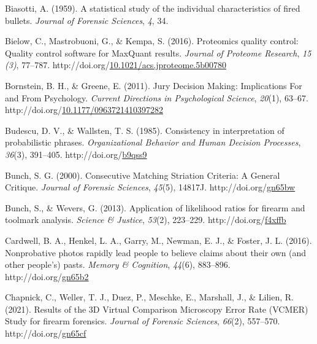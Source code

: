 \documentclass[print]{nuthesis}
\newlength{\cslhangindent}
\newenvironment{CSLReferences}[2]%
{\setlength{\parindent}{0pt}%
\everypar{\setlength{\hangindent}{\cslhangindent}}\ignorespaces}%
{\par}
\begin{document}
\begin{CSLReferences}{1}{0}
\leavevmode{}%
Biasotti, A. (1959). A statistical study of the individual characteristics of fired bullets. \emph{Journal of Forensic Sciences}, \emph{4}, 34.

\leavevmode{}%
Bielow, C., Mastrobuoni, G., \& Kempa, S. (2016). Proteomics quality control: Quality control software for MaxQuant results. \emph{Journal of Proteome Research}, \emph{15 (3)}, 77--787. http://doi.org/\href{https://doi.org/10.1021/acs.jproteome.5b00780}{10.1021/acs.jproteome.5b00780}

\leavevmode{}%
Bornstein, B. H., \& Greene, E. (2011). Jury {Decision} {Making}: {Implications} {For} and {From} {Psychology}. \emph{Current Directions in Psychological Science}, \emph{20}(1), 63--67. http://doi.org/\href{https://doi.org/10.1177/0963721410397282}{10.1177/0963721410397282}

\leavevmode{}%
Budescu, D. V., \& Wallsten, T. S. (1985). Consistency in interpretation of probabilistic phrases. \emph{Organizational Behavior and Human Decision Processes}, \emph{36}(3), 391--405. http://doi.org/\href{https://doi.org/b9qss9}{b9qss9}

\leavevmode{}%
Bunch, S. G. (2000). Consecutive {Matching} {Striation} {Criteria}: {A} {General} {Critique}. \emph{Journal of Forensic Sciences}, \emph{45}(5), 14817J. http://doi.org/\href{https://doi.org/gn65bw}{gn65bw}

\leavevmode{}%
Bunch, S., \& Wevers, G. (2013). Application of likelihood ratios for firearm and toolmark analysis. \emph{Science \& Justice}, \emph{53}(2), 223--229. http://doi.org/\href{https://doi.org/f4xffb}{f4xffb}

\leavevmode{}%
Cardwell, B. A., Henkel, L. A., Garry, M., Newman, E. J., \& Foster, J. L. (2016). Nonprobative photos rapidly lead people to believe claims about their own (and other people's) pasts. \emph{Memory \& Cognition}, \emph{44}(6), 883--896. http://doi.org/\href{https://doi.org/gn65b2}{gn65b2}

\leavevmode{}%
Chapnick, C., Weller, T. J., Duez, P., Meschke, E., Marshall, J., \& Lilien, R. (2021). Results of the {3D} {Virtual} {Comparison} {Microscopy} {Error} {Rate} ({VCMER}) {Study} for firearm forensics. \emph{Journal of Forensic Sciences}, \emph{66}(2), 557--570. http://doi.org/\href{https://doi.org/gn65cf}{gn65cf}


\end{CSLReferences}
\end{document}
